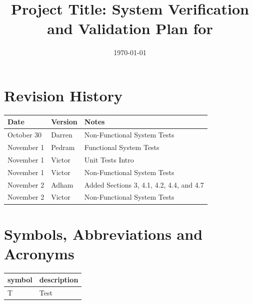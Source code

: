 \documentclass[12pt, titlepage]{article}
\begin{document}
\title{Project Title: System Verification and Validation Plan for \progname{}} 
\author{\authname}
\date{\today}
	
\maketitle


\section{Revision History}

\begin{tabularx}{\textwidth}{p{3cm}p{2cm}X}
\toprule {\bf Date} & {\bf Version} & {\bf Notes}\\
\midrule
October 30 & Darren & Non-Functional System Tests\\
November 1 & Pedram & Functional System Tests\\
November 1 & Victor & Unit Tests Intro\\
November 1 & Victor & Non-Functional System Tests\\
November 2 & Adham & Added Sections 3, 4.1, 4.2, 4.4, and 4.7\\
November 2 & Victor & Non-Functional System Tests\\
\bottomrule
\end{tabularx}

\newpage

\tableofcontents

\listoftables

\listoffigures

\newpage

\section{Symbols, Abbreviations and Acronyms}

\renewcommand{\arraystretch}{1.2}
\begin{tabular}{l l} 
  \toprule		
  \textbf{symbol} & \textbf{description}\\
  \midrule 
  T & Test\\
  \bottomrule
\end{tabular}\\


\newpage
\end{document}
